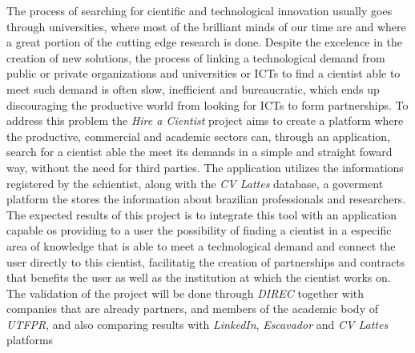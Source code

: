 \begin{abstractutfpr}
    The process of searching for cientific and technological innovation usually goes through universities, where most of the brilliant minds of our time are and where a great portion of the cutting edge research is done. Despite the excelence in the creation of new solutions, the process of linking a technological demand from public or private organizations and universities or ICTs to find a cientist able to meet such demand is often slow, inefficient and bureaucratic, which ends up discouraging the productive world from looking for ICTs to form partnerships. To address this problem the \emph{Hire a Cientist} project aims to create a platform where the productive, commercial and academic sectors can, through an application, search for a cientist able the meet its demands in a simple and straight foward way, without the need for third parties.
    The application utilizes the informations registered by the schientist, along with the \emph{CV Lattes} database, a goverment platform the stores the information about brazilian professionals and researchers. The expected results of this project is to integrate this tool with an application capable os providing to a user the possibility of finding a cientist in a especific area of knowledge that is able to meet a technological demand and connect the user directly to this cientist, facilitatig the creation of partnerships and contracts that benefits the user as well as the institution at which the cientist works on. The validation of the project will be done through \emph{DIREC} together with companies that are already partners, and members of the academic body of \emph{UTFPR}, and also comparing results with \emph{LinkedIn}, \emph{Escavador} and \emph{CV Lattes} platforms
\end{abstractutfpr}
